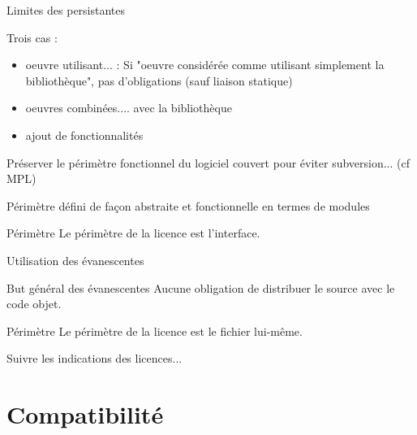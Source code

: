 \documentclass{beamer}
\begin{document}

\begin{frame}{Limites des persistantes}

Trois cas :

  \begin{itemize}
  \item oeuvre utilisant... : Si "oeuvre considérée comme utilisant simplement la bibliothèque", pas
    d'obligations (sauf liaison statique)
  \item oeuvres combinées.... avec la bibliothèque
  \item ajout de fonctionnalités
  \end{itemize}

Préserver le périmètre fonctionnel du logiciel couvert pour éviter subversion... (cf MPL)

Périmètre défini de façon abstraite et fonctionnelle en termes de modules

 \begin{alertblock}{Périmètre}
    Le périmètre de la licence est l'interface.
  \end{alertblock}
  
\end{frame}

\begin{frame}{Utilisation des évanescentes}

  \begin{block}{But général des évanescentes}
    Aucune obligation de distribuer le source avec le code objet.
  \end{block}

  \begin{alertblock}{Périmètre}
    Le périmètre de la licence est le fichier lui-même.
  \end{alertblock}

  Suivre les indications des licences...

\end{frame}

\section{Compatibilité}
\end{document}
